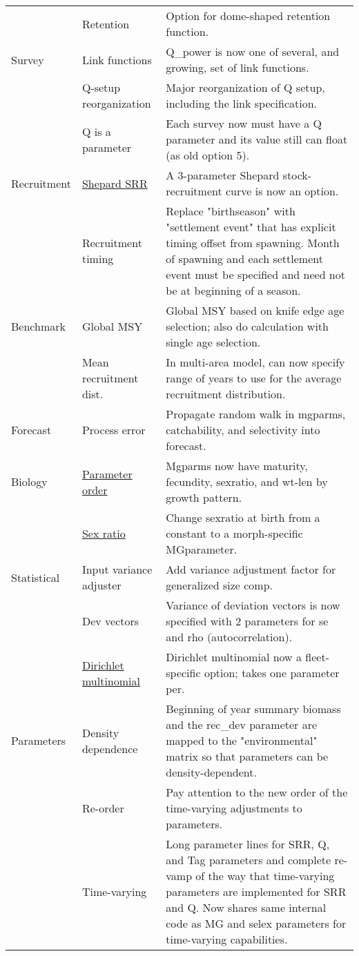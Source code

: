 \begin{center}
\begin{longtable}{p{2cm} p{3cm} p{10cm}}
						& Retention & Option for dome-shaped retention function. \\
				Survey  & Link functions & Q\_power is now one of several, and growing, set of link functions. \\
						& Q-setup reorganization & Major reorganization of Q setup, including the link specification. \\
						& Q is a parameter & Each survey now must have a Q parameter and its value still can float (as old option 5).\\
				Recruitment & \hyperlink{Shepard}{Shepard SRR} & A 3-parameter Shepard stock-recruitment curve is now an option.\\
						& Recruitment timing & Replace "birthseason" with "settlement event" that has explicit timing offset from spawning.  Month of spawning and each settlement event must be specified and need not be at beginning of a season.\\
				Benchmark & Global MSY &  Global MSY based on knife edge age selection; also do calculation with single age selection. \\
					    & Mean recruitment dist. & In multi-area model, can now specify range of years to use for the average recruitment distribution.\\
				Forecast & Process error & Propagate random walk in mgparms, catchability, and selectivity into forecast.\\
				Biology & \hyperlink{MGorder}{Parameter order} & Mgparms now have maturity, fecundity, sexratio, and wt-len by growth pattern.\\
				        & \hyperlink{SexRatio}{Sex ratio} & Change sexratio at birth from a constant to a morph-specific MGparameter. \\
				Statistical & Input variance adjuster & Add variance adjustment factor for generalized size comp. \\
						& Dev vectors & Variance of deviation vectors is now specified with 2 parameters for se and rho (autocorrelation).\\
						& \hyperlink{Dirichlet}{Dirichlet multinomial} & Dirichlet multinomial now a fleet-specific option; takes one parameter per. \\
				Parameters & Density dependence & Beginning of year summary biomass and the rec\_dev parameter are mapped to the    "environmental" matrix so that parameters can be density-dependent.\\
						& Re-order & Pay attention to the new order of the time-varying adjustments to parameters. \\
						& Time-varying & Long parameter lines for SRR, Q, and Tag parameters and complete re-vamp of the way that time-varying parameters are implemented for SRR and Q.  Now shares same internal code as MG and selex parameters for time-varying capabilities.\\
				\hline	
			\end{longtable}
		\end{center}

